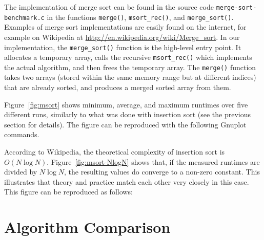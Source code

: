 \documentclass[a4paper,10pt]{article}
\begin{document}
The implementation of merge sort can be found in the source code \texttt{merge\--sort\--benchmark.c} in the functions \texttt{merge()}, \texttt{msort\_rec()}, and \texttt{merge\_sort()}.
Examples of merge sort implementations are easily found on the internet, for example on Wikipedia at \url{http://en.wikipedia.org/wiki/Merge_sort}.
In our implementation, the \texttt{merge\_sort()} function is the high-level entry point.
It allocates a temporary array, calls the recursive \texttt{msort\_rec()} which implements the actual algorithm, and then frees the temporary array.
The \texttt{merge()} function takes two arrays (stored within the same memory range but at different indices) that are already sorted, and produces a merged sorted array from them.

Figure~\ref{fig:msort} shows minimum, average, and maximum runtimes over five different runs, similarly to what was done with insertion sort (see the previous section for details).
The figure can be reproduced with the following Gnuplot commands.

\small\noindent

\normalsize

According to Wikipedia, the theoretical complexity of insertion sort is $O(N \log N)$.
Figure~\ref{fig:msort-NlogN} shows that, if the measured runtimes are divided by $N \log N$, the resulting values do converge to a non-zero constant.
This illustrates that theory and practice match each other very closely in this case.
This figure can be reproduced as follows:

\small\noindent

\normalsize



\section*{Algorithm Comparison}
\end{document}
